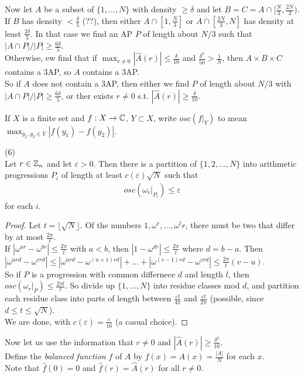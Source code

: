 \documentclass[a4paper]{article}
\begin{document}
Now let $A$ be a subset of $\{1,...,N\}$ with density $\geq \delta$ and let $B=C=A \cap [\frac{N}{3},\frac{2N}{3})$. If $B$ has density $<\frac{\delta}{5}$ (??), then either $A \cap [1,\frac{N}{3}]$ or $A \cap [\frac{2N}{3},N]$ has density at least $\frac{2\delta}{5}$. In that case we find an AP $P$ of length about $N/3$ such that $|A \cap P| / |P| \geq \frac{6\delta}{5}$.\\
Otherwise, ew find that if $\max_{r \neq 0}|\hat{A}(r)| \leq \frac{\delta}{10}$ and $\frac{\delta^3}{50} > \frac{1}{N}$, then $A \times B \times C$ contains a 3AP, so $A$ contains a 3AP.\\
So if $A$ does not contain a 3AP, then either we find $P$ of length about $N/3$ with $|A\cap P| / |P| \geq \frac{6\delta}{5}$, or ther exists $r \neq 0$ s.t. $|\hat{A}(r)| \geq \frac{\delta}{10}$.

\begin{defi}
    If $X$ is a finite set and $f:X \to \mathbb{C}$, $Y \subset X$, write $osc(f|_Y)$ to mean $\max_{y_1,y_2 \in Y} |f(y_1)-f(y_2)|$.
\end{defi}

\begin{lemma} (6)\\
    Let $r \in \mathbb{Z}_n$ and let $\varepsilon > 0$. Then there is a partition of $\{1,2,...,N\}$ into arithmetic progressions $P_i$ of length at least $c(\varepsilon)\sqrt{N}$ such that
    \begin{equation*}
        \begin{aligned}
            osc(\omega_r|_{P_i}) \leq \varepsilon
        \end{aligned}
    \end{equation*}
    for each $i$.
    \begin{proof}
        Let $t = \lfloor \sqrt{N}\rfloor$. Of the numbers $1,\omega^r,...,\omega^tr$, there must be two that differ by at most $\frac{2\pi}{t}$.\\
        If $|\omega^{ar}-\omega^{br}| \leq \frac{2\pi}{t}$ with $a < b$, then $|1-\omega^{dr}| \leq \frac{2\pi}{t}$ where $d=b-a$. Then $|\omega^{urd}-\omega^{vrd}| \leq |\omega^{urd}-\omega^{(u+1)rd}| + ... + |\omega^{(v-1)rd}-\omega^{vrd}| \leq \frac{2\pi}{t}(v-u)$.\\
        So if $P$ is a progression with common differnece $d$ and length $l$, then $osc(\omega_r|_P) \leq \frac{2\pi l}{t}$. So divide up $\{1,...,N\}$ into residue classes mod $d$, and partition each residue class into parts of length between $\frac{\varepsilon t}{4\pi}$ and $\frac{\varepsilon t}{2\pi}$ (possible, since $d \leq t \leq \sqrt{N}$).\\
        We are done, with $c(\varepsilon) = \frac{\varepsilon}{16}$ (a casual choice).
    \end{proof}
\end{lemma}
Now let us use the information that $r \neq 0$ and $|\hat{A}(r)| \geq \frac{\delta^2}{10}$.\\
Define the \emph{balanced function} $f$ of $A$ by $f(x) = A(x)=\frac{|A|}{N}$ for each $x$.\\
Note that $\hat{f}(0) = 0$ and $\hat{f}(r) = \hat{A}(r)$ for all $r \neq 0$.
\end{document}
